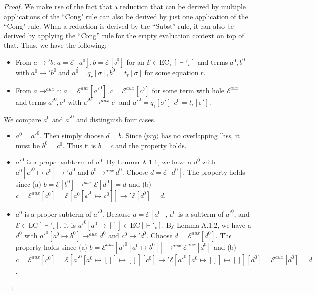 \cdpaux*
\begin{proof}
We make use of the fact that a reduction that can be derived by multiple applications of the ``Cong" rule can also be derived by just one application of the ``Cong" rule. When a reduction is derived by the ``Subst'' rule, it can also be derived by applying the ``Cong'' rule for the empty evaluation context on top of that. Thus, we have the following:
\begin{itemize}
\item From $a \longrightarrow' b$: $a = \mathcal{E}[a^0], b = \mathcal{E}[b^0]$ for an $\mathcal{E} \in \textrm{EC}_<[\vdash'_v]$ and terms $a^0, b^0$ with $a^0 \longrightarrow' b^0$ and $a^0 = q_r[\sigma], b^0 = t_r[\sigma]$ for some equation $r$.

\item From $a \longrightarrow^{aux} c$: $a = \mathcal{E}^{aux}[a'^0], c = \mathcal{E}^{aux}[c^0]$ for some term with hole $\mathcal{E}^{aux}$ and terms $a'^0, c^0$ with $a'^0 \longrightarrow^{aux} c^0$ and $a'^0 = q_\epsilon[\sigma'], c^0 = t_\epsilon[\sigma']$.
\end{itemize}

We compare $a^0$ and $a'^0$ and distinguish four cases.
\begin{itemize}
\item $a^0 = a'^0$. Then simply choose $d = b$. Since $\langle prg \rangle$ has no overlapping lhss, it must be $b^0 = c^0$. Thus it is $b = c$ and the property holds.

\item $a'^0$ is a proper subterm of $a^0$. By Lemma A.1.1, we have a $d^0$ with $a^0[a'^0 \mapsto c^0] \longrightarrow' d^0$ and $b^0 \longrightarrow^{aux} d^0$. Choose $d = \mathcal{E}[d^0]$. The property holds since (a) $b = \mathcal{E}[b^0] \longrightarrow^{aux} \mathcal{E}[d^0] = d$ and (b) $c = \mathcal{E}^{aux}[c^0] = \mathcal{E}[a^0[a'^0 \mapsto c^0]] \longrightarrow' \mathcal{E}[d^0] = d$.

\item $a^0$ is a proper subterm of $a'^0$. Because $a = \mathcal{E}[a^0]$, $a^0$ is a subterm of $a'^0$, and $\mathcal{E} \in \textrm{EC}[\vdash'_v]$, it is $a'^0[a^0 \mapsto []] \in \textrm{EC}[\vdash'_v]$. By Lemma A.1.2, we have a $d^0$ with $a'^0[a^0 \mapsto b^0] \longrightarrow^{aux} d^0$ and $c^0 \longrightarrow' d^0$. Choose $d = \mathcal{E}^{aux}[d^0]$. The property holds since (a) $b = \mathcal{E}^{aux}[a'^0[a^0 \mapsto b^0]] \longrightarrow^{aux} \mathcal{E}^{aux}[d^0]$ and (b) $c = \mathcal{E}^{aux}[c^0] = \mathcal{E}[a'^0[a^0 \mapsto []] \mapsto []][c^0] \longrightarrow' \mathcal{E}[a'^0[a^0 \mapsto []] \mapsto []][d^0] = \mathcal{E}^{aux}[d^0] = d$.


\end{itemize}
\end{proof}
